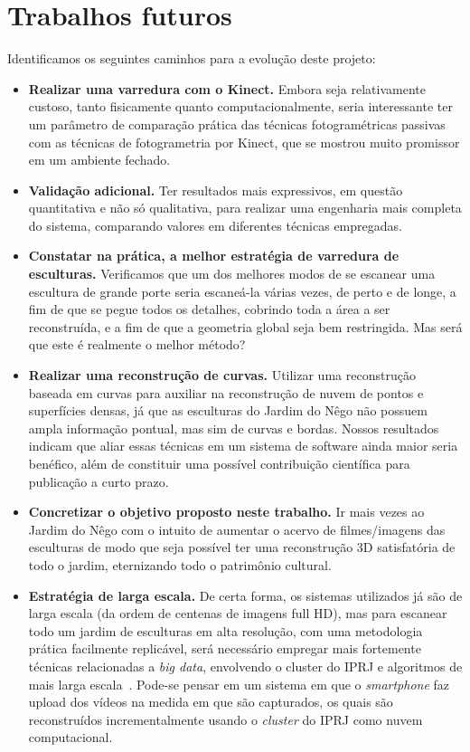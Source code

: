 \section*{Trabalhos futuros} Identificamos os seguintes caminhos para a evolução deste projeto:
\begin{itemize}
\item \textbf{Realizar uma varredura com o Kinect.} Embora seja relativamente
  custoso, tanto fisicamente quanto computacionalmente, seria interessante ter
  um parâmetro de comparação prática das técnicas fotogramétricas passivas com
as técnicas de fotogrametria por Kinect, que se mostrou muito promissor em um
ambiente fechado.  
\item \textbf{Validação adicional.} Ter resultados mais
  expressivos, em questão quantitativa e não só qualitativa, para realizar uma
  engenharia mais completa do sistema, comparando valores em diferentes técnicas
  empregadas.
\item \textbf{Constatar na prática, a melhor estratégia de varredura de
  esculturas.}
Verificamos que um dos melhores modos de se escanear uma escultura de grande
porte seria escaneá-la várias vezes, de perto e de longe, a fim de que se pegue todos os detalhes,
cobrindo toda a área a ser reconstruída, e a fim de que a geometria global seja
bem restringida. Mas será que este é realmente o melhor método?  
\item \textbf{Realizar uma reconstrução de curvas.} 
  Utilizar uma reconstrução baseada em curvas para auxiliar na reconstrução de
  nuvem de pontos e superfícies densas, já que as esculturas do Jardim do Nêgo
  não possuem ampla informação pontual, mas sim de curvas e bordas. Nossos
  resultados indicam que aliar essas técnicas em um sistema de software ainda
  maior seria benéfico, além de constituir uma possível contribuição científica
  para publicação a curto prazo.
\item \textbf{Concretizar o objetivo proposto neste trabalho.} Ir mais vezes
  ao Jardim do Nêgo com o intuito de aumentar o acervo de filmes/imagens das
  esculturas de modo que seja possível ter uma reconstrução 3D satisfatória de
  todo o jardim, eternizando todo o patrimônio cultural.  
\item \textbf{Estratégia de larga escala.} De certa forma, os sistemas
  utilizados já são de
  larga escala (da ordem de centenas de imagens full HD), mas para escanear todo um jardim de esculturas em alta
  resolução, com uma metodologia prática facilmente replicável,
  será necessário empregar mais fortemente técnicas relacionadas a \emph{big data}, envolvendo o cluster do IPRJ
  e algoritmos de mais larga escala~\cite{Argarwal:Snavely:etal:ICCV09}. Pode-se pensar em um sistema em que o
  \emph{smartphone} faz upload dos vídeos na medida em que são capturados, os
  quais são reconstruídos incrementalmente usando o \emph{cluster} do IPRJ como nuvem computacional.
\end{itemize}
